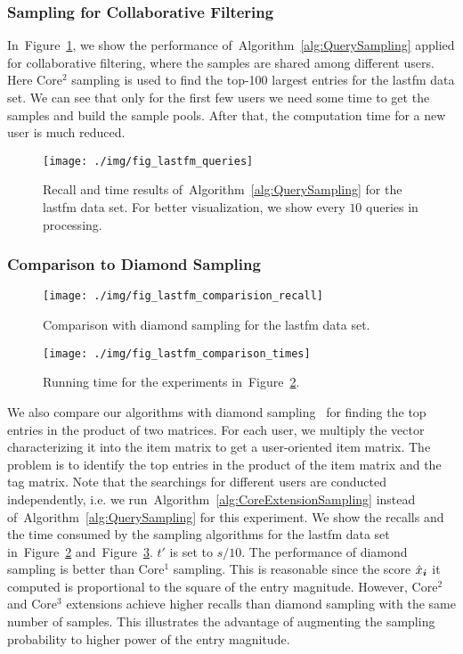\documentclass[letterpaper]{article}
\newcommand{\V}[1]{{\boldsymbol{{\MakeLowercase{#1}}}}}
\newcommand{\Fig}[1]{Figure~\ref{fig:#1}}
\newcommand{\Alg}[1]{Algorithm~\ref{alg:#1}}
\begin{document}
\subsubsection{Sampling for Collaborative Filtering}
In~\Fig{Queries}, we show the performance of~\Alg{QuerySampling} 
applied for collaborative filtering, 
where the samples are shared among different users. 
Here Core$^2$ sampling is used to find the top-100 largest entries for the lastfm data set. 
We can see that only for the first few users we need some time to get the samples 
and build the sample pools. 
After that, the computation time for a new user is much reduced.
\begin{figure}[!]
  \centering
  \texttt{[image: ./img/fig\_lastfm\_queries]}\\
  \caption{Recall and time results of~\Alg{QuerySampling} for the lastfm data set.
           For better visualization, we show every $10$ queries in processing.}
  \label{fig:Queries}
\end{figure}
\subsubsection{Comparison to Diamond Sampling}
\begin{figure}[!ht]
  \centering
  \texttt{[image: ./img/fig\_lastfm\_comparision\_recall]}\\
  \caption{Comparison with diamond sampling for the lastfm data set.}
  \label{fig:Comparison_recall}
\end{figure}
\begin{figure}[!ht]
    \centering
    \texttt{[image: ./img/fig\_lastfm\_comparison\_times]}\\
    \caption{Running time for the experiments in~\Fig{Comparison_recall}.}
\label{fig:Comparison_time}
\end{figure}
We also compare our algorithms with diamond sampling~\cite{BaPiKoSe15} 
for finding the top entries in the product of two matrices. 
For each user, we multiply the vector characterizing it into the item matrix 
to get a user-oriented item matrix. 
The problem is to identify the top entries in the product of the item matrix and the tag matrix. 
Note that the searchings for different users are conducted independently,
i.e. we run~\Alg{CoreExtensionSampling} instead of~\Alg{QuerySampling} for this experiment.
We show the recalls and the time consumed by the sampling algorithms for the lastfm data set
in~\Fig{Comparison_recall} and~\Fig{Comparison_time}.
$t'$ is set to $s/10$. 
The performance of diamond sampling is better than Core$^1$ sampling.
This is reasonable since the score $\hat{x}_{\V{i}}$ it computed is proportional to the square of the entry magnitude. 
However, Core$^2$ and Core$^3$ extensions achieve higher recalls than diamond sampling with the same number of samples. 
This illustrates the advantage of augmenting the sampling probability to higher power of the entry magnitude.





\end{document}

